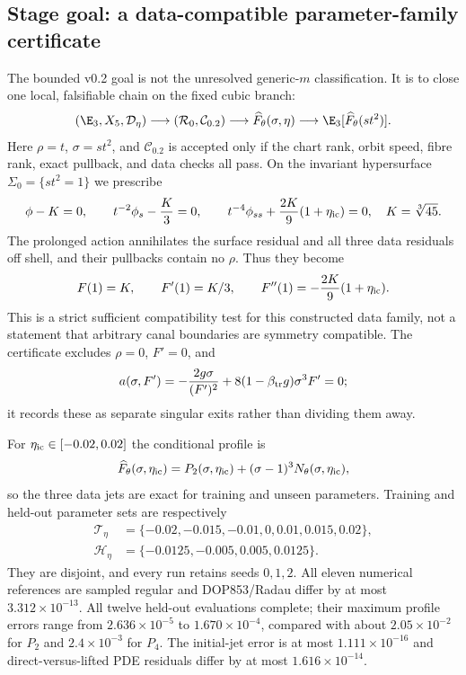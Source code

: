 \subsection{Stage goal: a data-compatible parameter-family certificate}
The bounded v0.2 goal is not the unresolved generic-$m$ classification. It is
to close one local, falsifiable chain on the fixed cubic branch:
\[
 (\E_3,X_5,\mathcal D_\eta)
 \longrightarrow (\mathcal R_0,\mathcal C_{0.2})
 \longrightarrow \widehat F_\theta(\sigma,\eta)
 \longrightarrow \E_3[\widehat F_\theta(st^2)].
\]
Here $\rho=t$, $\sigma=st^2$, and $\mathcal C_{0.2}$ is accepted only if the
chart rank, orbit speed, fibre rank, exact pullback, and data checks all pass.
On the invariant hypersurface $\Sigma_0=\{st^2=1\}$ we prescribe
\[
 \phi-K=0,\qquad t^{-2}\phi_s-\frac K3=0,\qquad
 t^{-4}\phi_{ss}+\frac{2K}{9}(1+\eta_{\rm ic})=0,
 \quad K=\sqrt[3]{45}.
\]
The prolonged action annihilates the surface residual and all three data
residuals off shell, and their pullbacks contain no $\rho$. Thus they become
\[
 F(1)=K,\qquad F'(1)=K/3,\qquad
 F''(1)=-\frac{2K}{9}(1+\eta_{\rm ic}).
\]
This is a strict sufficient compatibility test for this constructed data
family, not a statement that arbitrary canal boundaries are symmetry
compatible. The certificate excludes $\rho=0$, $F'=0$, and
\[
 a(\sigma,F')=-\frac{2g\sigma}{(F')^2}
 +8(1-\beta_{\rm tr}g)\sigma^3F'=0;
\]
it records these as separate singular exits rather than dividing them away.

For $\eta_{\rm ic}\in[-0.02,0.02]$ the conditional profile is
\[
 \widehat F_\theta(\sigma,\eta_{\rm ic})
 =P_2(\sigma,\eta_{\rm ic})
  +(\sigma-1)^3N_\theta(\sigma,\eta_{\rm ic}),
\]
so the three data jets are exact for training and unseen parameters. Training
and held-out parameter sets are respectively
\[
\begin{aligned}
 \mathcal T_\eta&=\{-0.02,-0.015,-0.01,0,0.01,0.015,0.02\},\\
 \mathcal H_\eta&=\{-0.0125,-0.005,0.005,0.0125\}.
\end{aligned}
\]
They are disjoint, and every run retains seeds $0,1,2$. All eleven numerical
references are sampled regular and DOP853/Radau differ by at most
$3.312\times10^{-13}$. All twelve held-out evaluations complete; their
maximum profile errors range from $2.636\times10^{-5}$ to
$1.670\times10^{-4}$, compared with about $2.05\times10^{-2}$ for $P_2$ and
$2.4\times10^{-3}$ for $P_4$. The initial-jet error is at most
$1.111\times10^{-16}$ and direct-versus-lifted PDE residuals differ by at most
$1.616\times10^{-14}$.


